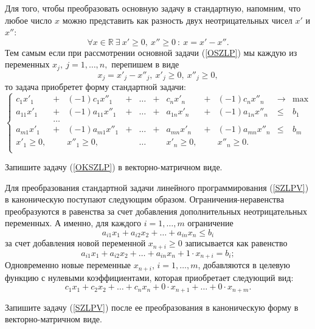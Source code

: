    Для того, чтобы преобразовать основную задачу в стандартную, напомним, что любое
    число $x$ можно представить как разность двух неотрицательных
    чисел $x'$ и $x''$:
\[
    \forall x\in\mathbb{R} \ \exists \ x'\geqslant0, \ x''\geqslant0 \ : \ x=x'-x''.
\]
    Тем самым если при рассмотрении основной задачи (\ref{OSZLP}) мы
    каждую из переменных $x_{j}, \ j=1,\ldots,n,$ перепишем в виде
\[
    x_{j}=x'_{j}-x''_{j}, \ x'_{j}\geqslant0, \ x''_{j}\geqslant0,
\]
    то задача приобретет форму стандартной задачи:
    \begin{equation} \label{OKSZLP}
\left\{
\begin{array}{ccccccccccc}
c_1 x'_1 &+ & (-1)c_1 x''_1 &+    & \ldots &+& c_n x'_n &+&(-1)c_n x''_n&\to & \max\\
         a_{11}x'_1 &+ & (-1)a_{11}x''_1& + &\ldots &+& a_{1n} x'_n &+&(-1)a_{1n} x''_n &\leqslant& b_1 \\
                      & \ldots & & & & &\\
         a_{m1} x'_1 &+ & (-1)a_{m1} x''_1 &+& \ldots &+& a_{mn} x'_n &+&(-1)a_{mn} x''_n&\leqslant& b_m\\
            x'_1\geqslant0, && x''_1\geqslant0, & & \ldots & & x'_n\geqslant0, && x''_n\geqslant0.\\
         \end{array} \right.
\end{equation}

\begin{exer}
    Запишите задачу (\ref{OKSZLP}) в векторно-матричном виде.
\end{exer}





Для преобразования стандартной задачи линейного программирования
(\ref{SZLPV}) в каноническую поступают следующим образом.
 Ограничения-неравенства преобразуются в равенства за счет
добавления дополнительных неотрицательных переменных. А именно, для
каждого $i=1,\ldots,m$ ограничение
\[  a_{i1} x_1 + a_{i2} x_2  +\ldots + a_{in} x_n \leqslant b_i\]
за счет добавления новой переменной $x_{n+i} \geqslant 0$ записывается как равенство
\[  a_{i1} x_1 + a_{i2} x_2  +\ldots + a_{in} x_n + 1 \cdot x_{n+i} = b_i;\]
Одновременно новые  переменные $x_{n+i}$, $i=1,\ldots,m$, добавляются в целевую функцию с
нулевыми коэффициентами, которая приобретает следующий вид:
\[
    c_1 x_1  +  c_2 x_2 +  \ldots + c_n x_n + 0 \cdot x_{n+1}+\ldots+0 \cdot x_{n+m}.
\]

\begin{exer}
    Запишите задачу (\ref{SZLPV}) после ее преобразования в каноническую форму
    в векторно-матричном виде.
\end{exer}


